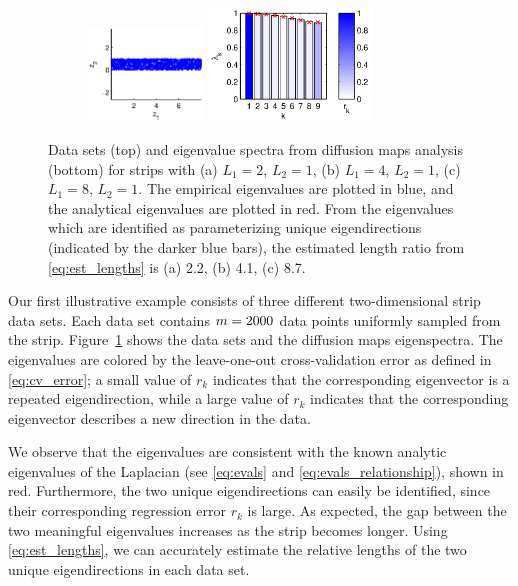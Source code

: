 \begin{figure}[!t]
%
%
\begin{subfigure}{0.3\textwidth}
\includegraphics[height=2.5cm]{strip_data_L8}
\includegraphics[height=3cm]{strip_spectrum_L8}
\caption{}
\end{subfigure}
%
\caption[Eigenvalues and eigenvectors of diffusion maps on a two-dimensional strip]{Data sets (top) and eigenvalue spectra from diffusion maps analysis (bottom) for strips with (a) $L_1 = 2$, $L_2 = 1$, (b) $L_1 = 4$, $L_2 = 1$, (c) $L_1 = 8$, $L_2 = 1$. The empirical eigenvalues are plotted in blue, and the analytical eigenvalues are plotted in red. From the eigenvalues which are identified as parameterizing unique eigendirections (indicated by the darker blue bars), the estimated length ratio from \eqref{eq:est_lengths} is (a) 2.2, (b) 4.1, (c) 8.7.}
\label{fig:strip_compare_analytic}
\end{figure}

Our first illustrative example consists of three different two-dimensional strip data sets.
%
Each data set contains $m=2000$ data points uniformly sampled from the strip.
%
Figure~\ref{fig:strip_compare_analytic} shows the data sets and the diffusion maps eigenspectra.
%
The eigenvalues are colored by the leave-one-out cross-validation error as defined in \eqref{eq:cv_error}; a small value of $r_k$ indicates that the corresponding eigenvector is a repeated eigendirection, while a large value of $r_k$ indicates that the corresponding eigenvector describes a new direction in the data.
%

We observe that the eigenvalues are consistent with the known analytic eigenvalues of the Laplacian (see \eqref{eq:evals} and \eqref{eq:evals_relationship}), shown in red.
%
Furthermore, the two unique eigendirections can easily be identified, since their corresponding regression error $r_k$ is large.
%
As expected, the gap between the two meaningful eigenvalues increases as the strip becomes longer.
%
Using \eqref{eq:est_lengths}, we can accurately estimate the relative lengths of the two unique eigendirections in each data set.


